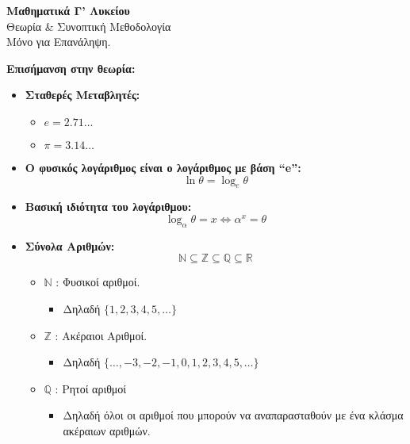 \documentclass[a4paper,12pt]{article}
\begin{document}
\begin{center}
    \LARGE \textbf{Μαθηματικά Γ’ Λυκείου}\\[1ex]
    \large Θεωρία \& Συνοπτική Μεθοδολογία\\
    \normalsize Μόνο για Επανάληψη.
\end{center}

\vspace{1em}

\textbf{Επισήμανση στην θεωρία:}

\vspace{0.5em}
\begin{itemize}[leftmargin=1em]

    \item \textbf{Σταθερές Μεταβλητές:}
    \begin{itemize}
        \item $e = 2.71\ldots$
        \item $\pi = 3.14\ldots$
    \end{itemize}

    \item \textbf{Ο φυσικός λογάριθμος είναι ο λογάριθμος με βάση ``e'':}
    \[
    \ln \theta = \log_e \theta
    \]

    \item \textbf{Βασική ιδιότητα του λογάριθμου:}
    \[
    \log_\alpha \theta = x \iff \alpha^x = \theta
    \]

    \item \textbf{Σύνολα Αριθμών:}
    \[
    \mathbb{N} \subseteq \mathbb{Z} \subseteq \mathbb{Q} \subseteq \mathbb{R}
    \]

    \begin{itemize}
        \item $\mathbb{N}$ : Φυσικοί αριθμοί.
        \begin{itemize}
            \item Δηλαδή $\{1, 2, 3, 4, 5, \ldots\}$
        \end{itemize}

        \item $\mathbb{Z}$ : Ακέραιοι Αριθμοί.
        \begin{itemize}
            \item Δηλαδή $\{\ldots, -3, -2, -1, 0, 1, 2, 3, 4, 5, \ldots\}$
        \end{itemize}

        \item $\mathbb{Q}$ : Ρητοί αριθμοί
        \begin{itemize}
            \item Δηλαδή όλοι οι αριθμοί που μπορούν να αναπαρασταθούν με ένα κλάσμα ακέ\-ραιων αριθμών.
        \end{itemize}


\end{itemize}
\end{itemize}
\end{document}
